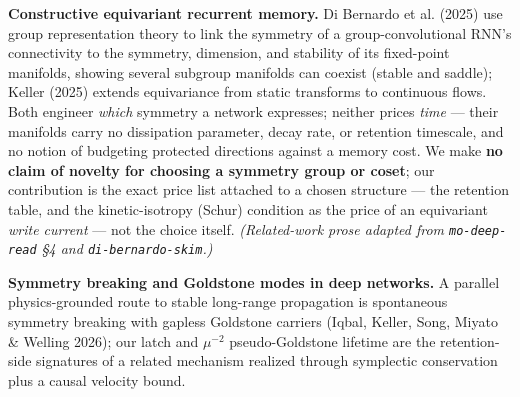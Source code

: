 \documentclass[10pt]{article}
\begin{document}
\textbf{Constructive equivariant recurrent memory.} Di Bernardo et al. (2025) use group representation theory to link the symmetry of a group-convolutional RNN's connectivity to the symmetry, dimension, and stability of its fixed-point manifolds, showing several subgroup manifolds can coexist (stable and saddle); Keller (2025) extends equivariance from static transforms to continuous flows. Both engineer \emph{which} symmetry a network expresses; neither prices \emph{time} --- their manifolds carry no dissipation parameter, decay rate, or retention timescale, and no notion of budgeting protected directions against a memory cost. We make \textbf{no claim of novelty for choosing a symmetry group or coset}; our contribution is the exact price list attached to a chosen structure --- the retention table, and the kinetic-isotropy (Schur) condition as the price of an equivariant \emph{write current} --- not the choice itself. \emph{(Related-work prose adapted from \texttt{mo-deep-read} \S4 and \texttt{di-bernardo-skim}.)}

\textbf{Symmetry breaking and Goldstone modes in deep networks.} A parallel physics-grounded route to stable long-range propagation is spontaneous symmetry breaking with gapless Goldstone carriers (Iqbal, Keller, Song, Miyato \& Welling 2026); our latch and $\mu^{-2}$ pseudo-Goldstone lifetime are the retention-side signatures of a related mechanism realized through symplectic conservation plus a causal velocity bound.
\end{document}
